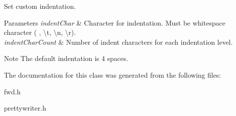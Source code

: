 Set custom indentation. 


\begin{DoxyParams}{Parameters}
{\em indent\+Char} & Character for indentation. Must be whitespace character (\textquotesingle{} \textquotesingle{}, \textquotesingle{}\textbackslash{}t\textquotesingle{}, \textquotesingle{}\textbackslash{}n\textquotesingle{}, \textquotesingle{}\textbackslash{}r\textquotesingle{}). \\
\hline
{\em indent\+Char\+Count} & Number of indent characters for each indentation level. \\
\hline
\end{DoxyParams}
\begin{DoxyNote}{Note}
The default indentation is 4 spaces. 
\end{DoxyNote}


The documentation for this class was generated from the following files\+:\begin{DoxyCompactItemize}
\item 
fwd.\+h\item 
prettywriter.\+h\end{DoxyCompactItemize}
